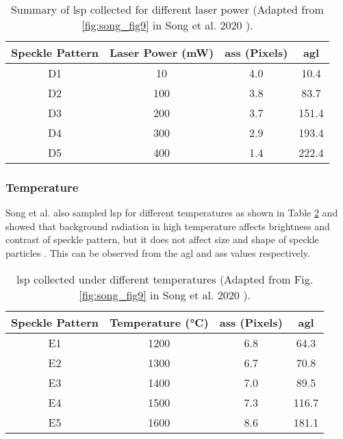     \begin{table}
        \centering
        \footnotesize
        \renewcommand{\arraystretch}{1.2}
        \begin{tabular}{cccc}
            \toprule
            \textbf{Speckle Pattern} & \textbf{Laser Power (mW)} & \textbf{\gls{ass} (Pixels)} & \textbf{\gls{agl}} \\
            \midrule
            
            D1 & 10 & 4.0 & 10.4 \\
            D2 & 100 & 3.8 & 83.7 \\
            D3 & 200 & 3.7 & 151.4 \\
            D4 & 300 & 2.9 & 193.4 \\
            D5 & 400 & 1.4 & 222.4 \\
    
            \bottomrule
        \end{tabular}
        \caption{Summary of \gls{lsp} collected for different laser power (Adapted from \ref{fig:song_fig9} in Song et al. 2020 \cite{song}).}
        \label{table:song_table_d}
    \end{table}


    \subsubsection{Temperature}
    Song et al. also sampled \gls{lsp} for different temperatures as shown in Table \ref{table:song_table_e} and showed that background radiation in high temperature affects brightness and contrast of speckle pattern, but it does not affect size and shape of speckle particles \cite{song}. This can be observed from the \gls{agl} and \gls{ass} values respectively.

    \begin{table}
        \centering
        \footnotesize
        \renewcommand{\arraystretch}{1.2}
        \begin{tabular}{cccc}
            \toprule
            \textbf{Speckle Pattern} & \textbf{Temperature (°C)} & \textbf{\gls{ass} (Pixels)} & \textbf{\gls{agl}} \\
            \midrule
            
            E1 & 1200 & 6.8 & 64.3 \\
            E2 & 1300 & 6.7 & 70.8 \\
            E3 & 1400 & 7.0 & 89.5 \\
            E4 & 1500 & 7.3 & 116.7 \\
            E5 & 1600 & 8.6 & 181.1 \\
    
            \bottomrule
        \end{tabular}
        \caption{\gls{lsp} collected under different temperatures (Adapted from Fig. \ref{fig:song_fig9} in Song et al. 2020 \cite{song}).}
        \label{table:song_table_e}
    \end{table}
    
